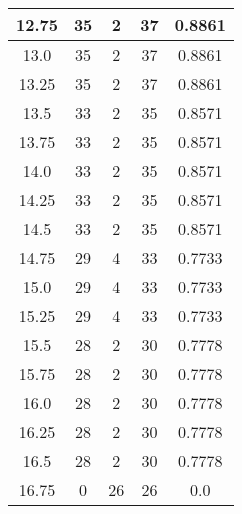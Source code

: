\documentclass[letterpaper, 12pt]{article}
\begin{document}
\begin{longtable}{|c|c|c|c|c|}
\hline
12.75 & 35 & 2 & 37 & 0.8861 \\
\hline
13.0 & 35 & 2 & 37 & 0.8861 \\
\hline
13.25 & 35 & 2 & 37 & 0.8861 \\
\hline
13.5 & 33 & 2 & 35 & 0.8571 \\
\hline
13.75 & 33 & 2 & 35 & 0.8571 \\
\hline
14.0 & 33 & 2 & 35 & 0.8571 \\
\hline
14.25 & 33 & 2 & 35 & 0.8571 \\
\hline
14.5 & 33 & 2 & 35 & 0.8571 \\
\hline
14.75 & 29 & 4 & 33 & 0.7733 \\
\hline
15.0 & 29 & 4 & 33 & 0.7733 \\
\hline
15.25 & 29 & 4 & 33 & 0.7733 \\
\hline
15.5 & 28 & 2 & 30 & 0.7778 \\
\hline
15.75 & 28 & 2 & 30 & 0.7778 \\
\hline
16.0 & 28 & 2 & 30 & 0.7778 \\
\hline
16.25 & 28 & 2 & 30 & 0.7778 \\
\hline
16.5 & 28 & 2 & 30 & 0.7778 \\
\hline
16.75 & 0 & 26 & 26 & 0.0 \\
\hline
\end{longtable}
\end{document}
